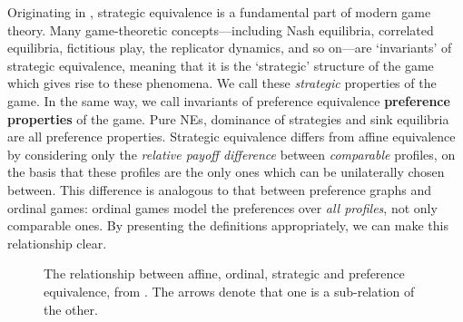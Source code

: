 \documentclass[preprint,authoryear]{elsarticle}
\begin{document}
Originating in \cite{moulin1978strategically}, strategic equivalence is a fundamental part of modern game theory. Many game-theoretic concepts---including Nash equilibria, correlated equilibria, fictitious play, the replicator dynamics, and so on---are `invariants' of strategic equivalence, meaning that it is the `strategic' structure of the game which gives rise to these phenomena. We call these \emph{strategic} properties of the game. In the same way, we call invariants of preference equivalence \textbf{preference properties} of the game. Pure NEs, dominance of strategies and sink equilibria are all preference properties. Strategic equivalence differs from affine equivalence by considering only the \emph{relative payoff difference} between \emph{comparable} profiles, on the basis that these profiles are the only ones which can be unilaterally chosen between. This difference is analogous to that between preference graphs and ordinal games: ordinal games model the preferences over \emph{all profiles}, not only comparable ones. By presenting the definitions appropriately, we can make this relationship clear.
\begin{figure}
    \centering
    
    \caption{The relationship between affine, ordinal, strategic and preference equivalence, from \cite{biggarthesis}. The arrows denote that one is a sub-relation of the other.}
    \label{fig:equivalence classes}
\end{figure}
\end{document}
